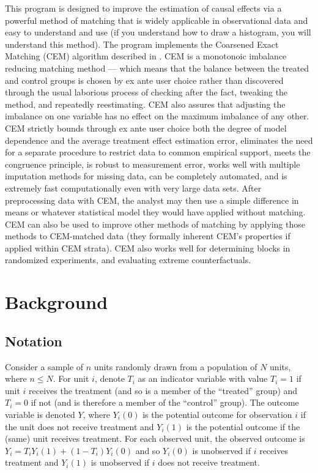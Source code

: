 \documentclass[11pt]{article}
\begin{document}
This program is designed to improve the estimation of causal effects
via a powerful method of matching that is widely applicable in
observational data and easy to understand and use (if you understand
how to draw a histogram, you will understand this method).  The
program implements the Coarsened Exact Matching (CEM) algorithm
described in \citep{IacKinPor11c}.  CEM is a monotonoic imbalance
reducing matching method --- which means that the balance between the
treated and control groups is chosen by ex ante user choice rather
than discovered through the usual laborious process of checking after
the fact, tweaking the method, and repeatedly reestimating.  CEM also
assures that adjusting the imbalance on one variable has no effect on
the maximum imbalance of any other.  CEM strictly bounds through ex
ante user choice both the degree of model dependence and the average
treatment effect estimation error, eliminates the need for a separate
procedure to restrict data to common empirical support, meets the
congruence principle, is robust to measurement error, works well with
multiple imputation methods for missing data, can be completely
automated, and is extremely fast computationally even with very large
data sets.  After preprocessing data with CEM, the analyst may then
use a simple difference in means or whatever statistical model they
would have applied without matching.  CEM can also be used to improve
other methods of matching by applying those methods to CEM-matched
data (they formally inherent CEM's properties if applied within CEM
strata).  CEM also works well for determining blocks in randomized
experiments, and evaluating extreme counterfactuals.

\section{Background}

\subsection{Notation}

Consider a sample of $n$ units  randomly drawn from a population of $N$
units, where $n \leq N$.  For unit $i$, denote $T_i$ as an indicator
variable with value $T_i=1$ if unit $i$ receives the treatment (and so
is a member of the ``treated'' group) and $T_i=0$ if not (and is
therefore a member of the ``control'' group).  The outcome variable is
denoted $Y$, where $Y_i(0)$ is the potential outcome for observation
$i$ if the unit does not receive treatment and $Y_i(1)$ is the
potential outcome if the (same) unit receives treatment.  For each
observed unit, the observed outcome is $Y_i = T_i Y_i(1) + (1-T_i)
Y_i(0)$ and so $Y_i(0)$ is unobserved if $i$ receives treatment and
$Y_i(1)$ is unobserved if $i$ does not receive treatment.
\end{document}
